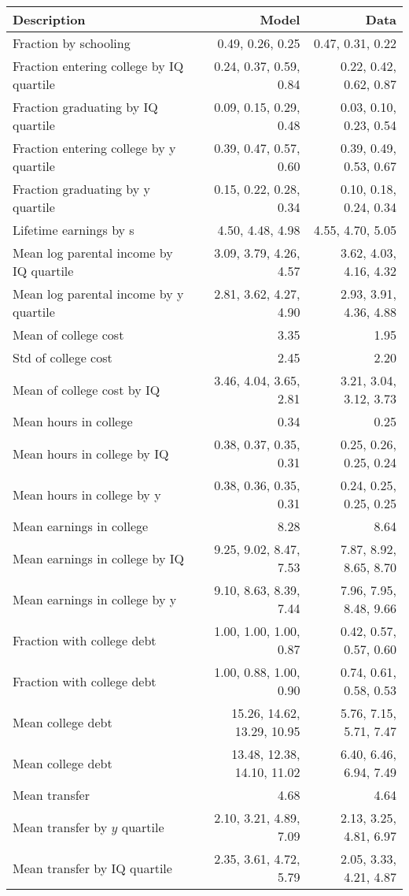 \begin{tabular}{lrr}
\hline
Description & Model  & Data  \\
\hline
Fraction by schooling & 0.49, 0.26, 0.25  & 0.47, 0.31, 0.22  \\
Fraction entering college by IQ quartile & 0.24, 0.37, 0.59, 0.84  & 0.22, 0.42, 0.62, 0.87  \\
Fraction graduating by IQ quartile & 0.09, 0.15, 0.29, 0.48  & 0.03, 0.10, 0.23, 0.54  \\
Fraction entering college by y quartile & 0.39, 0.47, 0.57, 0.60  & 0.39, 0.49, 0.53, 0.67  \\
Fraction graduating by y quartile & 0.15, 0.22, 0.28, 0.34  & 0.10, 0.18, 0.24, 0.34  \\
Lifetime earnings by s & 4.50, 4.48, 4.98  & 4.55, 4.70, 5.05  \\
Mean log parental income by IQ quartile & 3.09, 3.79, 4.26, 4.57  & 3.62, 4.03, 4.16, 4.32  \\
Mean log parental income by y quartile & 2.81, 3.62, 4.27, 4.90  & 2.93, 3.91, 4.36, 4.88  \\
Mean of college cost & 3.35  & 1.95  \\
Std of college cost & 2.45  & 2.20  \\
Mean of college cost by IQ & 3.46, 4.04, 3.65, 2.81  & 3.21, 3.04, 3.12, 3.73  \\
Mean hours in college & 0.34  & 0.25  \\
Mean hours in college by IQ & 0.38, 0.37, 0.35, 0.31  & 0.25, 0.26, 0.25, 0.24  \\
Mean hours in college by y & 0.38, 0.36, 0.35, 0.31  & 0.24, 0.25, 0.25, 0.25  \\
Mean earnings in college & 8.28  & 8.64  \\
Mean earnings in college by IQ & 9.25, 9.02, 8.47, 7.53  & 7.87, 8.92, 8.65, 8.70  \\
Mean earnings in college by y & 9.10, 8.63, 8.39, 7.44  & 7.96, 7.95, 8.48, 9.66  \\
Fraction with college debt & 1.00, 1.00, 1.00, 0.87  & 0.42, 0.57, 0.57, 0.60  \\
Fraction with college debt & 1.00, 0.88, 1.00, 0.90  & 0.74, 0.61, 0.58, 0.53  \\
Mean college debt & 15.26, 14.62, 13.29, 10.95  & 5.76, 7.15, 5.71, 7.47  \\
Mean college debt & 13.48, 12.38, 14.10, 11.02  & 6.40, 6.46, 6.94, 7.49  \\
Mean transfer & 4.68  & 4.64  \\
Mean transfer by $y$ quartile & 2.10, 3.21, 4.89, 7.09  & 2.13, 3.25, 4.81, 6.97  \\
Mean transfer by IQ quartile & 2.35, 3.61, 4.72, 5.79  & 2.05, 3.33, 4.21, 4.87  \\
\hline
\end{tabular}%
